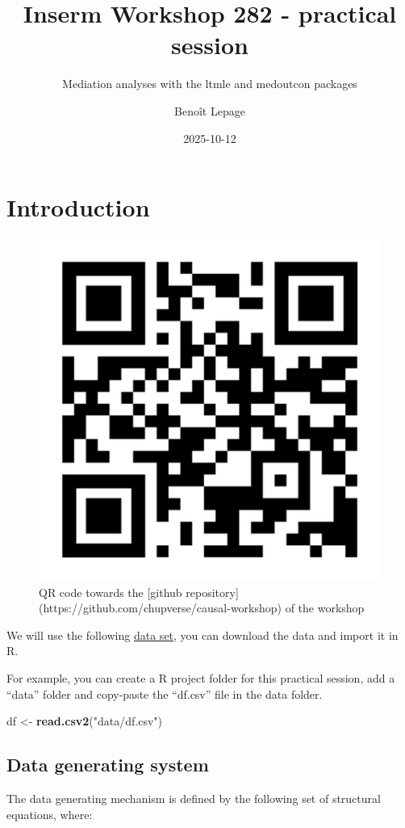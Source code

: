 \documentclass[
]{book}
\title{Inserm Workshop 282 - practical session}
\subtitle{Mediation analyses with the ltmle and medoutcon packages}
\author{Benoît Lepage}
\date{2025-10-12}
\newenvironment{Shaded}{\begin{snugshade}}{\end{snugshade}}
\newcommand{\FunctionTok}[1]{\textcolor[rgb]{0.13,0.29,0.53}{\textbf{#1}}}
\newcommand{\NormalTok}[1]{#1}
\newcommand{\OtherTok}[1]{\textcolor[rgb]{0.56,0.35,0.01}{#1}}
\newcommand{\StringTok}[1]{\textcolor[rgb]{0.31,0.60,0.02}{#1}}
\begin{document}
\maketitle

{
\setcounter{tocdepth}{1}
\tableofcontents
}
\chapter{Introduction}\label{introduction}

\begin{figure}

{\centering \includegraphics[width=0.3\linewidth]{./images/url} 

}

\caption{QR code towards the [github repository](https://github.com/chupverse/causal-workshop) of the workshop}\label{fig:qrcode}
\end{figure}

We will use the following \href{https://github.com/benoitlepage/Inserm_workshop_282/blob/main/data/df.csv}{data set}, you can download the data and import it in R.

For example, you can create a R project folder for this practical session, add a ``data'' folder and copy-paste the ``df.csv'' file in the data folder.

\begin{Shaded}
\begin{Highlighting}[]
\NormalTok{df }\OtherTok{\textless{}{-}} \FunctionTok{read.csv2}\NormalTok{(}\StringTok{"data/df.csv"}\NormalTok{)}
\end{Highlighting}
\end{Shaded}

\section{Data generating system}\label{data-generating-system}

The data generating mechanism is defined by the following set of structural equations, where:
\end{document}
